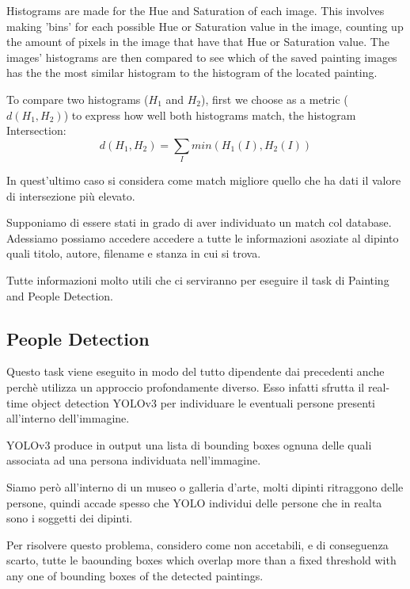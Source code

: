 \documentclass[10pt,twocolumn,letterpaper]{article}
\begin{document}
Histograms are made for the Hue and Saturation of each image. This involves making 'bins' for each possible Hue or Saturation value in the image, counting up the amount of pixels in the image that have that Hue or Saturation value. The images' histograms are then compared to see which of the saved painting images has the the most similar histogram to the histogram of the located painting.  

To compare two histograms ($H_1$ and $H_2$), first we choose as a metric ($d(H_1, H_2)$) to express how well both histograms match, the histogram Intersection:
\begin{equation}
   d(H_1, H_2) = \sum_{I} min(H_1(I), H_2(I))
   \label{eq:5}
\end{equation}

In quest'ultimo caso si considera come match migliore quello che ha dati il valore di intersezione più elevato.

Supponiamo di essere stati in grado di aver individuato un match col database. Adessiamo possiamo accedere accedere a tutte le informazioni asoziate al dipinto quali titolo, autore, filename e stanza in cui si trova. 

Tutte informazioni molto utili che ci serviranno per eseguire il task di Painting and People Detection.

\subsection{People Detection}

Questo task viene eseguito in modo del tutto dipendente dai precedenti anche perchè utilizza un approccio profondamente diverso. Esso infatti sfrutta il real-time object detection YOLOv3 per individuare le eventuali persone presenti all'interno dell'immagine.

YOLOv3 produce in output una lista di bounding boxes ognuna delle quali associata ad una persona individuata nell'immagine.

Siamo però all'interno di un museo o galleria d'arte, molti dipinti ritraggono delle persone, quindi accade spesso che YOLO individui delle persone che in realta sono i soggetti dei dipinti. 

Per risolvere questo problema, considero come non accetabili, e di conseguenza scarto, tutte le baounding boxes which overlap more than
a fixed threshold with any one of bounding boxes of the detected paintings.
\end{document}
